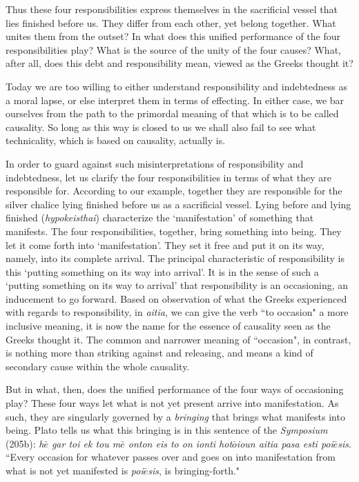 \documentclass[paper=a4, fontsize=11pt,twoside]{scrartcl}
\begin{document}
Thus these four responsibilities express themselves in the sacrificial vessel that lies finished before us. They differ from each other, yet belong together. What unites them from the outset? In what does this unified performance of the four responsibilities play? What is the source of the unity of the four causes? What, after all, does this debt and responsibility mean, viewed as the Greeks thought it? 

Today we are too willing to either understand responsibility and indebtedness as a moral lapse, or else interpret them in terms of effecting. In either case, we bar ourselves from the path to the primordal meaning of that which is to be called causality. So long as this way is closed to us we shall also fail to see what technicality, which is based on causality, actually is.

In order to guard against such misinterpretations of responsibility and indebtedness, let us clarify the four responsibilities in terms of what they are responsible for. According to our example, together they are responsible for the silver chalice lying finished before us as a sacrificial vessel. Lying before and lying finished (\textit{hypokeisthai}) characterize the `manifestation' of something that manifests. The four responsibilities, together, bring something into being. They let it come forth into `manifestation'. They set it free and put it on its way, namely, into its complete arrival. The principal characteristic of responsibility is this `putting something on its way into arrival'. It is in the sense of such a `putting something on its way to arrival' that responsibility is an occasioning, an inducement to go forward. Based on observation of what the Greeks experienced with regards to responsibility, in \textit{aitia}, we can give the verb ``to occasion" a more inclusive meaning, it is now the name for the essence of causality seen as the Greeks thought it. The common and narrower meaning of ``occasion", in contrast, is nothing more than striking against and releasing, and means a kind of secondary cause within the whole causality.

But in what, then, does the unified performance of the four ways of occasioning play? These four ways let what is not yet present arrive into manifestation. As such, they are singularly governed by a \textit{bringing} that brings what manifests into being. Plato tells us what this bringing is in this sentence of the \textit{Symposium} (205b): \textit{h$\bar{e}$ gar toi ek tou m$\bar{e}$ onton eis to on ionti hot$\bar{o}$ioun aitia pasa esti poi$\bar{e}$sis}. ``Every occasion for whatever passes over and goes on into manifestation from what is not yet manifested is \textit{poi$\bar{e}$sis}, is bringing-forth."
\end{document}

